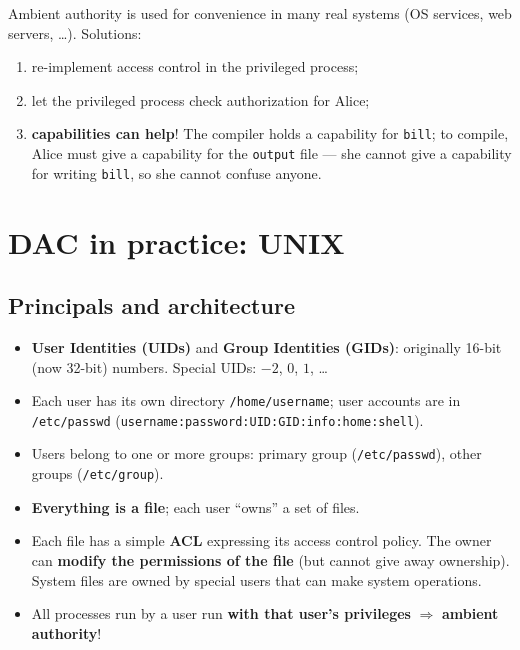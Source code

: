 \begin{algbox}[title=How to avoid confused deputies]
Ambient authority is used for convenience in many real systems (OS services, web
servers, \ldots). Solutions:
\begin{enumerate}
  \item re-implement access control in the privileged process;
  \item let the privileged process check authorization for Alice;
  \item \textbf{capabilities can help}! The compiler holds a capability for
        \texttt{bill}; to compile, Alice must give a capability for the
        \texttt{output} file --- she cannot give a capability for writing
        \texttt{bill}, so she cannot confuse anyone.
\end{enumerate}
\end{algbox}

\section{DAC in practice: UNIX}

\subsection{Principals and architecture}

\begin{defnbox}[title=UNIX principals and groups]
\begin{itemize}
  \item \textbf{User Identities (UIDs)} and \textbf{Group Identities (GIDs)}:
        originally 16-bit (now 32-bit) numbers. Special UIDs: $-2$, $0$, $1$, \ldots
  \item Each user has its own directory \texttt{/home/username}; user accounts are in
        \texttt{/etc/passwd} (\texttt{username:password:UID:GID:info:home:shell}).
  \item Users belong to one or more groups: primary group (\texttt{/etc/passwd}),
        other groups (\texttt{/etc/group}).
\end{itemize}
\end{defnbox}

\begin{propbox}[title=UNIX security architecture]
\begin{itemize}
  \item \textbf{Everything is a file}; each user ``owns'' a set of files.
  \item Each file has a simple \textbf{ACL} expressing its access control policy. The
        owner can \textbf{modify the permissions of the file} (but cannot give away
        ownership). System files are owned by special users that can make system
        operations.
  \item All processes run by a user run \textbf{with that user's privileges}
        $\Rightarrow$ \textbf{ambient authority}!
\end{itemize}
\end{propbox}

